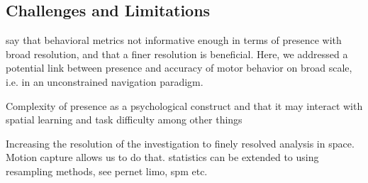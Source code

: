 \subsection{Challenges and Limitations}

say that behavioral metrics not informative enough in terms of presence with broad resolution, and that a finer resolution is beneficial. Here, we addressed a potential link between presence and accuracy of motor behavior on broad scale, i.e. in an unconstrained navigation paradigm. 

Complexity of presence as a psychological construct and that it may interact with spatial learning and task difficulty among other things~\cite{} %

Increasing the resolution of the investigation to finely resolved analysis in space. Motion capture allows us to do that. 
statistics can be extended to using resampling methods, see pernet limo, spm etc.